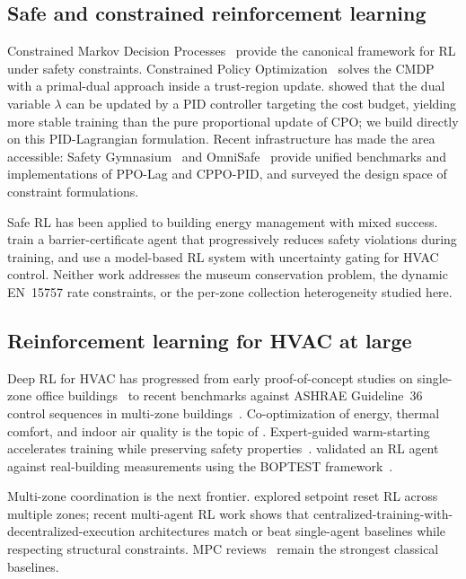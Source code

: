 \documentclass[11pt,a4paper]{article}
\begin{document}
\subsection{Safe and constrained reinforcement learning}

Constrained Markov Decision Processes~\citep{altman1999constrained}
provide the canonical framework for RL under safety constraints.
Constrained Policy Optimization~\citep{achiam2017cpo} solves the CMDP
with a primal-dual approach inside a trust-region update.
\citet{stooke2020responsive} showed that the dual variable $\lambda$ can
be updated by a PID controller targeting the cost budget, yielding more
stable training than the pure proportional update of CPO; we build
directly on this PID-Lagrangian formulation. Recent infrastructure has
made the area accessible: Safety Gymnasium~\citep{ji2023safety} and
OmniSafe~\citep{ji2023omnisafe} provide unified benchmarks and
implementations of PPO-Lag and CPPO-PID, and
\citet{constraint_formulations_2024} surveyed the design space of
constraint formulations.

Safe RL has been applied to building energy management with mixed
success. \citet{safe_rl_buildings_mdpi_2025} train a barrier-certificate
agent that progressively reduces safety violations during training, and
\citet{safe_mbrl_hvac_2024} use a model-based RL system with uncertainty
gating for HVAC control. Neither work addresses the museum conservation
problem, the dynamic EN~15757 rate constraints, or the per-zone
collection heterogeneity studied here.

\subsection{Reinforcement learning for HVAC at large}

Deep RL for HVAC has progressed from early proof-of-concept studies on
single-zone office buildings~\citep{wang2017drlhvac,brandi2022online} to
recent benchmarks against ASHRAE Guideline~36 control sequences in
multi-zone buildings~\citep{drl_g36_2025}. Co-optimization of energy,
thermal comfort, and indoor air quality is the topic of
\citet{drl_co_optimize_2024}. Expert-guided warm-starting accelerates
training while preserving safety properties~\citep{efficient_assured_2025}.
\citet{boptest_rl_2025} validated an RL agent against real-building
measurements using the BOPTEST framework~\citep{boptest_mpc_2023}.

Multi-zone coordination is the next frontier.
\citet{drl_setpoint_multizone_2022} explored setpoint reset RL across
multiple zones; recent multi-agent RL work
\citep{marl_zone_alloc_2025,marl_electrochromic_2025,marl_demand_response_2025}
shows that centralized-training-with-decentralized-execution
architectures match or beat single-agent baselines while respecting
structural constraints. MPC reviews~\citep{drgona2020mpc_review} remain
the strongest classical baselines.
\end{document}
